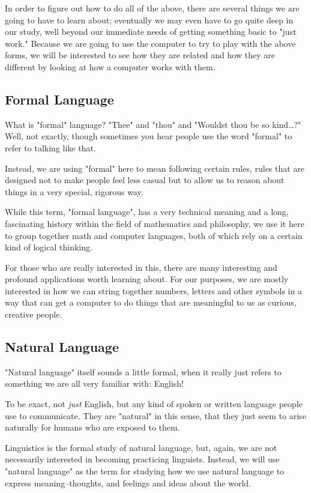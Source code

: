 \documentclass[11pt]{article}
\begin{document}
In order to figure out how to do all of the above, there are several
things we are going to have to learn about; eventually we may even
have to go quite deep in our study, well beyond our immediate needs of
getting something basic to "just work." Because we are going to use
the computer to try to play with the above forms, we will be
interested to see how they are related and how they are different by
looking at how a computer works with them.
\subsection{Formal Language}
\label{sec:orgheadline12}
What is "formal" language? "Thee" and "thou" and "Wouldst thou be so
kind\ldots{}?" Well, not exactly, though sometimes you hear people use the
word "formal" to refer to talking like that.

Instead, we are using "formal" here to mean following certain rules,
rules that are designed not to make people feel less casual but to
allow us to reason about things in a very special, rigorous way.

While this term, "formal language", has a very technical meaning and a
long, fascinating history within the field of mathematics and
philosophy, we use it here to group together math and computer
languages, both of which rely on a certain kind of logical thinking.

For those who are really interested in this, there are many
interesting and profound applications worth learning about. For our
purposes, we are mostly interested in how we can string together
numbers, letters and other symbols in a way that can get a computer to
do things that are meaningful to us as curious, creative people.
\subsection{Natural Language}
\label{sec:orgheadline13}
"Natural language" itself sounds a little formal, when it really just
refers to something we are all very familiar with: English!

To be exact, not \emph{just} English, but any kind of spoken or written
language people use to communicate. They are "natural" in this sense,
that they just seem to arise naturally for humans who are exposed to
them. 

Linguistics is the formal study of natural language, but, again, we
are not necessarily interested in becoming practicing linguists.
Instead, we will use "natural language" as the term for studying how
we use natural language to express meaning--thoughts, and feelings and
ideas about the world.
\end{document}
